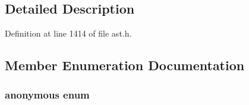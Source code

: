 \subsection{Detailed Description}


Definition at line 1414 of file ast.h.



\subsection{Member Enumeration Documentation}
\hypertarget{classmocha_1_1_binary_exp_a6556e5472480591fec07f524fed6d093}{
\subsubsection[{"@10}]{\setlength{\rightskip}{0pt plus 5cm}anonymous enum}}
\label{classmocha_1_1_binary_exp_a6556e5472480591fec07f524fed6d093}

